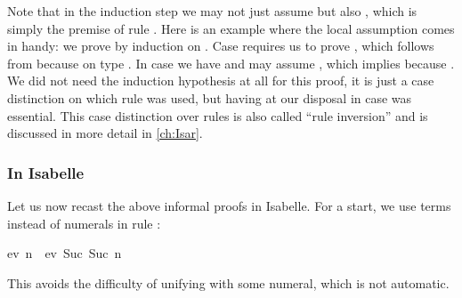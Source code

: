 \begin{isabellebody}
\begin{isamarkuptext}
Note that in the induction step we may not just assume  but also
\mbox{}, which is simply the premise of rule .  Here is an example where the local assumption  comes in
handy: we prove  by induction on .
Case  requires us to prove , which follows
from  because  on type . In
case  we have \mbox{} and may assume
, which implies  because . We did not need the induction hypothesis at all for this proof,
it is just a case distinction on which rule was used, but having  at our disposal in case  was essential.
This case distinction over rules is also called ``rule inversion''
and is discussed in more detail in \autoref{ch:Isar}.

\subsubsection{In Isabelle}

Let us now recast the above informal proofs in Isabelle. For a start,
we use  terms instead of numerals in rule :
\begin{isabelle}%
ev\ n\ {}\ ev\ {}Suc\ {}Suc\ n{}{}%
\end{isabelle}
This avoids the difficulty of unifying  with some numeral,
which is not automatic.


\end{isamarkuptext}
\end{isabellebody}
